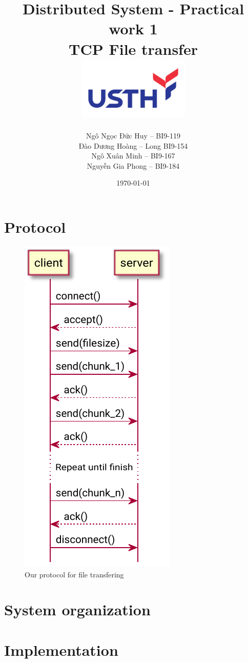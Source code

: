 \documentclass{article}
\begin{document}
\begin{titlepage}
	\title{
		\Large{Distributed System - Practical work 1} \\
		\Huge{\textbf{TCP File transfer}} \\
		\includegraphics[width=0.4\textwidth]{logo-usth-pa3-01.png}
	}
	\author{
		 Ngô Ngọc Đức Huy -- BI9-119 \\
		 Đào Dương Hoàng -- Long BI9-154 \\
		 Ngô Xuân Minh -- BI9-167 \\
		 Nguyễn Gia Phong -- BI9-184
	}
	\date{\today}
\end{titlepage}

\maketitle

\section{Protocol}

\begin{figure}
	\centering
	\includegraphics{file-protocol-1.pdf}
	\caption{Our protocol for file transfering}
\end{figure}

\section{System organization}
\section{Implementation}
\end{document}
